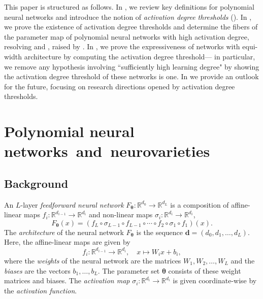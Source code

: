 \documentclass[12pt]{article}
\theoremstyle{definition}
\newcommand{\btheta}{{\boldsymbol{\theta}}}
\newcommand{\demph}[1]{\emph{{\color{RoyalBlue}#1}}}
\begin{document}
This paper is structured as follows. 
In , we review key definitions for polynomial neural networks and introduce the notion of \demph{activation degree thresholds} ().
In , we prove the existence of activation degree thresholds and 
determine the fibers of the parameter map of polynomial neural networks with high activation degree, resolving 
 \cite[Conjecture 16]{KTB2019} and \cite[Conjecture 5.2]{KLW2024}, raised by \cite{EleniusThesis}.
In , we prove the expressiveness of networks with equi-width architecture by computing the activation degree threshold--- in particular, we remove any hypothesis involving  ``sufficiently high learning degree" by showing the activation degree threshold of these networks is one. 
In  we provide an outlook for the future, focusing on research directions opened by activation degree thresholds. 

\section{Polynomial neural networks~and~neurovarieties}\label{s:notation}

{\subsection{Background}}

An $L$-layer \demph{feedforward neural network} $F_\btheta:\mathbb{R}^{d_0}\to\mathbb{R}^{d_L}$ is a composition of affine-linear maps $f_i:\mathbb{R}^{d_{i-1}}\to\mathbb{R}^{d_i}$ and non-linear maps $\sigma_i:\mathbb{R}^{d_i}\to\mathbb{R}^{d_i}$, 
\begin{equation*}
    F_\btheta(x)=(f_L\circ\sigma_{L-1}\circ f_{L-1}\circ\cdots\circ f_2\circ\sigma_1\circ f_1)(x).
\end{equation*}
The \demph{architecture} of the neural network $F_\btheta$ is the sequence $\mathbf{d} = (d_0,d_1,\dotsc,d_L)$. 
Here, the affine-linear maps are given by
\begin{equation*}
    f_i:\mathbb{R}^{d_{i-1}}\to\mathbb{R}^{d_i},\quad x\mapsto W_i x + b_i,
\end{equation*}
where the \demph{weights} of the neural network are the matrices $W_1,W_2,\dots,W_L$ and the \demph{biases} are the vectors $b_1,\dotsc,b_L$. The parameter set $\btheta$ consists of these weight matrices and biases.
The \demph{activation map} $\sigma_i:\mathbb{R}^{d_i}\to\mathbb{R}^{d_i}$ is given coordinate-wise by the \demph{activation function}.
\end{document}
